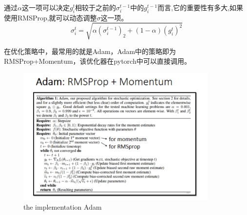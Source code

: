 \documentclass{article}
\begin{document}
\indent 通过\(\alpha\)这一项可以决定\(g^{t}_{i}\)相较于之前的\(\sigma^{t-1}_{i}\)中的\(g^{t-1}_{i}\)而言,它的重要性有多大,如果使用RMSProp,就可以动态调整\(\sigma\)这一项。
\begin{equation}
    \sigma^{t}_{i}=\sqrt{\alpha(\sigma^{t-1}_{i})_{2} + (1- \alpha)(g^{t}_{i})^{2}}
\end{equation}

\indent 在优化策略中，最常用的就是Adam，Adam中的策略即为RMSProp+Momentum，该优化器在pytorch中可以直接调用。\par
\begin{figure}[H]
    \centering
    \includegraphics[width=10cm]{picture/Adam.png}
    \caption{the implementation Adam}
    \label{fig:galxy}
\end{figure}
\end{document}
